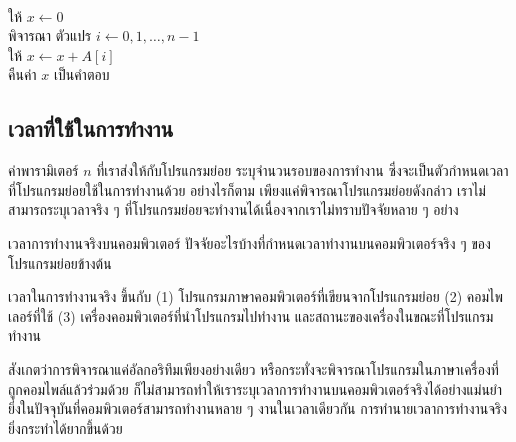 \begin{algt}
\\
\hspace*{0.2in} ให้ $x\leftarrow 0$\\
\hspace*{0.2in} พิจารณา ตัวแปร $i\leftarrow 0,1,\ldots,n-1$\\
\hspace*{0.2in}\hspace*{0.2in} ให้ $x \leftarrow x + A[i]$\\
\hspace*{0.2in} คืน{\wbr}ค่า $x$ เป็น{\wbr}คำตอบ{\wbr}
\end{algt}

\subsection{เวลา{\wbr}ที่{\wbr}ใช้{\wbr}ใน{\wbr}การ{\wbr}ทำงาน}

ค่า{\wbr}พารามิเตอร์ $n$ ที่{\wbr}เรา{\wbr}ส่ง{\wbr}ให้{\wbr}กับ{\wbr}โปรแกรมย่อย ระบุ{\wbr}จำนวน{\wbr}รอบ{\wbr}ของ{\wbr}การ{\wbr}ทำงาน{\wbr}
ซึ่ง{\wbr}จะ{\wbr}เป็น{\wbr}ตัวกำหนด{\wbr}เวลา{\wbr}ที่{\wbr}โปรแกรมย่อย{\wbr}ใช้{\wbr}ใน{\wbr}การ{\wbr}ทำงาน{\wbr}ด้วย อย่างไรก็ตาม{\wbr}
เพียงแค่{\wbr}พิจารณา{\wbr}โปรแกรมย่อย{\wbr}ดังกล่าว เรา{\wbr}ไม่{\wbr}สามารถ{\wbr}ระบุ{\wbr}เวลาจริง ๆ
ที่{\wbr}โปรแกรมย่อย{\wbr}จะ{\wbr}ทำงาน{\wbr}ได้{\wbr}เนื่องจาก{\wbr}เรา{\wbr}ไม่{\wbr}ทราบ{\wbr}ปัจจัย{\wbr}หลาย ๆ อย่าง{\wbr}

\begin{quiz}{เวลา{\wbr}การ{\wbr}ทำงาน{\wbr}จริง{\wbr}บน{\wbr}คอมพิวเตอร์}
ปัจจัย{\wbr}อะไร{\wbr}บ้าง{\wbr}ที่{\wbr}กำหนด{\wbr}เวลา{\wbr}ทำงาน{\wbr}บน{\wbr}คอมพิวเตอร์{\wbr}จริง ๆ ของ{\wbr}โปรแกรมย่อย{\wbr}ข้างต้น{\wbr}
\end{quiz}
\begin{quizans}
เวลา{\wbr}ใน{\wbr}การ{\wbr}ทำงาน{\wbr}จริง ขึ้น{\wbr}กับ (1) โปรแกรม{\wbr}ภาษาคอมพิวเตอร์{\wbr}ที่{\wbr}เขียน{\wbr}จาก{\wbr}โปรแกรมย่อย (2)
คอม{\wbr}ไพ{\wbr}เลอร์{\wbr}ที่{\wbr}ใช้ (3) เครื่อง{\wbr}คอมพิวเตอร์{\wbr}ที่{\wbr}นำ{\wbr}โปรแกรม{\wbr}ไป{\wbr}ทำงาน{\wbr}
และ{\wbr}สถานะ{\wbr}ของ{\wbr}เครื่องใน{\wbr}ขณะที่{\wbr}โปรแกรม{\wbr}ทำงาน  
\end{quizans}

สังเกต{\wbr}ว่า{\wbr}การ{\wbr}พิจารณา{\wbr}แค่{\wbr}อัล{\wbr}กอ{\wbr}ริ{\wbr}ทึม{\wbr}เพียง{\wbr}อย่างเดียว{\wbr}
หรือ{\wbr}กระทั่ง{\wbr}จะ{\wbr}พิจารณา{\wbr}โปรแกรม{\wbr}ใน{\wbr}ภาษาเครื่อง{\wbr}ที่{\wbr}ถูก{\wbr}คอมไพล์{\wbr}แล้ว{\wbr}ร่วม{\wbr}ด้วย{\wbr}
ก็{\wbr}ไม่{\wbr}สามารถ{\wbr}ทำ{\wbr}ให้{\wbr}เรา{\wbr}ระบุ{\wbr}เวลา{\wbr}การ{\wbr}ทำงาน{\wbr}บน{\wbr}คอมพิวเตอร์{\wbr}จริง{\wbr}ได้{\wbr}อย่าง{\wbr}แม่นยำ{\wbr}
ยิ่ง{\wbr}ใน{\wbr}ปัจจุบัน{\wbr}ที่{\wbr}คอมพิวเตอร์{\wbr}สามารถ{\wbr}ทำงาน{\wbr}หลาย ๆ งาน{\wbr}ใน{\wbr}เวลา{\wbr}เดียวกัน{\wbr}
การ{\wbr}ทำนาย{\wbr}เวลา{\wbr}การ{\wbr}ทำงาน{\wbr}จริง{\wbr}ยิ่ง{\wbr}กระทำ{\wbr}ได้{\wbr}ยาก{\wbr}ขึ้น{\wbr}ด้วย{\wbr}

